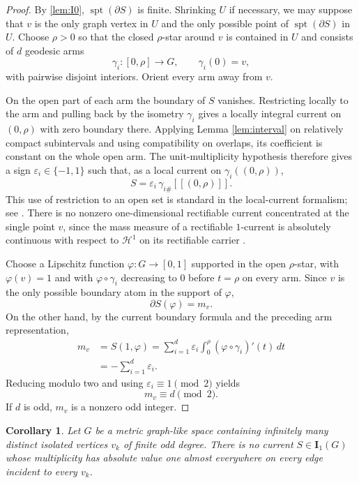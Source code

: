 \documentclass[11pt]{article}
\newtheorem{corollary}[theorem]{Corollary}
\theoremstyle{remark}
\newcommand{\I}{\mathbf I}
\newcommand{\Hh}{\mathcal H}
\newcommand{\spt}{\operatorname{spt}}
\newcommand{\llbracket}{[\![}
\newcommand{\rrbracket}{]\!]}
\begin{document}
\begin{proof}
By \cref{lem:I0}, $\spt(\partial S)$ is finite. Shrinking $U$ if necessary, we may suppose that $v$ is the only graph vertex in $U$ and the only possible point of $\spt(\partial S)$ in $U$. Choose $\rho>0$ so that the closed $\rho$-star around $v$ is contained in $U$ and consists of $d$ geodesic arms
\[
   \gamma_i:[0,\rho]\longrightarrow G,\qquad \gamma_i(0)=v,
\]
with pairwise disjoint interiors. Orient every arm away from $v$.

On the open part of each arm the boundary of $S$ vanishes. Restricting locally to the arm and pulling back by the isometry $\gamma_i$ gives a locally integral current on $(0,\rho)$ with zero boundary there. Applying Lemma \ref{lem:interval} on relatively compact subintervals and using compatibility on overlaps, its coefficient is constant on the whole open arm. The unit-multiplicity hypothesis therefore gives a sign $\varepsilon_i\in\{-1,1\}$ such that, as a local current on $\gamma_i((0,\rho))$,
\[
  S
  =\varepsilon_i\,\gamma_{i\#}\llbracket(0,\rho)\rrbracket.
\]
This use of restriction to an open set is standard in the local-current formalism; see \cite{Lang11}. There is no nonzero one-dimensional rectifiable current concentrated at the single point $v$, since the mass measure of a rectifiable $1$-current is absolutely continuous with respect to $\Hh^1$ on its rectifiable carrier \cite[Theorem~4.6]{AK00}.

Choose a Lipschitz function $\varphi:G\to[0,1]$ supported in the open $\rho$-star, with $\varphi(v)=1$ and with $\varphi\circ\gamma_i$ decreasing to $0$ before $t=\rho$ on every arm. Since $v$ is the only possible boundary atom in the support of $\varphi$,
\[
     \partial S(\varphi)=m_v.
\]
On the other hand, by the current boundary formula and the preceding arm representation,
\[
\begin{aligned}
  m_v
  &=S(1,\varphi)
    =\sum_{i=1}^{d}\varepsilon_i
      \int_0^\rho (\varphi\circ\gamma_i)'(t)\,dt\\
  &=-\sum_{i=1}^{d}\varepsilon_i.
\end{aligned}
\]
Reducing modulo two and using $\varepsilon_i\equiv1\pmod2$ yields
\[
     m_v\equiv d\pmod2.
\]
If $d$ is odd, $m_v$ is a nonzero odd integer.
\end{proof}

\begin{corollary}\label{cor:infinite-odd}
Let $G$ be a metric graph-like space containing infinitely many distinct isolated vertices $v_k$ of finite odd degree. There is no current $S\in\I_1(G)$ whose multiplicity has absolute value one almost everywhere on every edge incident to every $v_k$.
\end{corollary}
\end{document}
